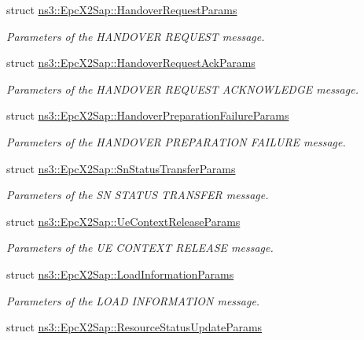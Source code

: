 \begin{DoxyCompactItemize}
struct \hyperlink{structns3_1_1EpcX2Sap_1_1HandoverRequestParams}{ns3\+::\+Epc\+X2\+Sap\+::\+Handover\+Request\+Params}
\begin{DoxyCompactList}\small\item\em Parameters of the H\+A\+N\+D\+O\+V\+ER R\+E\+Q\+U\+E\+ST message. \end{DoxyCompactList}\item 
struct \hyperlink{structns3_1_1EpcX2Sap_1_1HandoverRequestAckParams}{ns3\+::\+Epc\+X2\+Sap\+::\+Handover\+Request\+Ack\+Params}
\begin{DoxyCompactList}\small\item\em Parameters of the H\+A\+N\+D\+O\+V\+ER R\+E\+Q\+U\+E\+ST A\+C\+K\+N\+O\+W\+L\+E\+D\+GE message. \end{DoxyCompactList}\item 
struct \hyperlink{structns3_1_1EpcX2Sap_1_1HandoverPreparationFailureParams}{ns3\+::\+Epc\+X2\+Sap\+::\+Handover\+Preparation\+Failure\+Params}
\begin{DoxyCompactList}\small\item\em Parameters of the H\+A\+N\+D\+O\+V\+ER P\+R\+E\+P\+A\+R\+A\+T\+I\+ON F\+A\+I\+L\+U\+RE message. \end{DoxyCompactList}\item 
struct \hyperlink{structns3_1_1EpcX2Sap_1_1SnStatusTransferParams}{ns3\+::\+Epc\+X2\+Sap\+::\+Sn\+Status\+Transfer\+Params}
\begin{DoxyCompactList}\small\item\em Parameters of the SN S\+T\+A\+T\+US T\+R\+A\+N\+S\+F\+ER message. \end{DoxyCompactList}\item 
struct \hyperlink{structns3_1_1EpcX2Sap_1_1UeContextReleaseParams}{ns3\+::\+Epc\+X2\+Sap\+::\+Ue\+Context\+Release\+Params}
\begin{DoxyCompactList}\small\item\em Parameters of the UE C\+O\+N\+T\+E\+XT R\+E\+L\+E\+A\+SE message. \end{DoxyCompactList}\item 
struct \hyperlink{structns3_1_1EpcX2Sap_1_1LoadInformationParams}{ns3\+::\+Epc\+X2\+Sap\+::\+Load\+Information\+Params}
\begin{DoxyCompactList}\small\item\em Parameters of the L\+O\+AD I\+N\+F\+O\+R\+M\+A\+T\+I\+ON message. \end{DoxyCompactList}\item 
struct \hyperlink{structns3_1_1EpcX2Sap_1_1ResourceStatusUpdateParams}{ns3\+::\+Epc\+X2\+Sap\+::\+Resource\+Status\+Update\+Params}

\end{DoxyCompactItemize}
